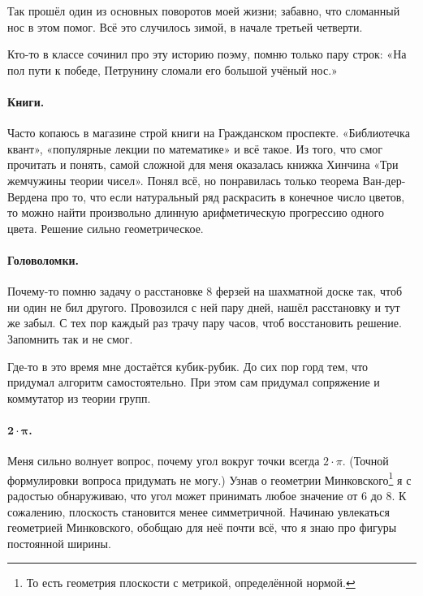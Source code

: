 \documentclass{book}
\begin{document}
Так прошёл один из основных поворотов моей жизни;
забавно, что сломанный нос в этом помог.
Всё это случилось зимой, в начале третьей четверти.

Кто-то в классе сочинил про эту историю поэму, помню только пару строк: 
«На пол пути к победе, Петрунину сломали его большой учёный нос.»

\paragraph{Книги.}
Часто копаюсь в магазине строй книги на Гражданском проспекте.
«Библиотечка квант», «популярные лекции по математике» и всё такое.
Из того, что смог прочитать и понять, 
самой сложной для меня оказалась книжка Хинчина «Три жемчужины теории чисел».
Понял всё, но понравилась только теорема Ван-дер-Вердена про то, что если натуральный ряд раскрасить в конечное число цветов, то можно найти произвольно длинную арифметическую прогрессию одного цвета.
Решение сильно геометрическое.


\paragraph{Головоломки.}
Почему-то помню задачу о расстановке 8 ферзей на шахматной доске так, чтоб ни один не бил другого.
Провозился с ней пару дней, нашёл расстановку и тут же забыл.
С тех пор каждый раз трачу пару часов, чтоб восстановить решение. 
Запомнить так и не смог.

Где-то в это время мне достаётся кубик-рубик.
До сих пор горд тем, что придумал алгоритм самостоятельно.
При этом сам придумал сопряжение и коммутатор из теории групп.

\paragraph{$\bm{2{\cdot}\pi}$.}
Меня сильно волнует вопрос, почему угол вокруг точки всегда $2{\cdot}\pi$.
(Точной формулировки вопроса придумать не могу.)
Узнав о геометрии Минковского\footnote{То есть геометрия плоскости с метрикой, определённой нормой.} я с радостью обнаруживаю, что угол может принимать любое значение от $6$ до $8$.
К сожалению, плоскость становится менее симметричной.
Начинаю увлекаться геометрией Минковского, обобщаю для неё почти всё, что я знаю про фигуры постоянной ширины.
\end{document}
